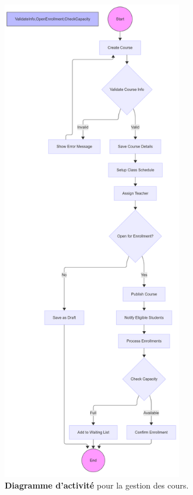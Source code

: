 \begin{figure}[H]
  \centering
  \includegraphics[width=0.7\textwidth,height=0.8\textheight,keepaspectratio]{pfe-pics/diagrames/Activity Diagram (for Course Management).png}
  \caption{\textbf{Diagramme d'activité} pour la gestion des cours.}
  \label{fig:course_management}
\end{figure}

